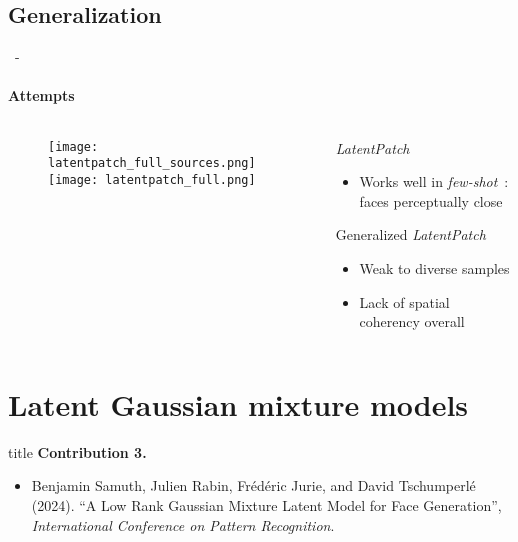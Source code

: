 \documentclass[aspectratio=169, 22pt]{beamer}
\begin{document}
\subsection{Generalization}
\begin{frame}{\secname~- \subsecname}
  \framesubtitle{Attempts}
  \begin{columns}
    \begin{column}{0.5\linewidth}
      \begin{figure}
        \centering
        \texttt{[image: latentpatch\_full\_sources.png]}
        \texttt{[image: latentpatch\_full.png]}
      \end{figure}
    \end{column}
    \begin{column}{0.5\linewidth}
      \begin{exampleblock}{\emph{LatentPatch}}
        \begin{itemize}
        \item Works well in \emph{few-shot} : faces perceptually close
        \end{itemize}
      \end{exampleblock}
      \begin{alertblock}{Generalized \emph{LatentPatch}}
        \begin{itemize}
        \item Weak to diverse samples
        \item Lack of spatial coherency overall
        \end{itemize}
      \end{alertblock}
    \end{column}
  \end{columns}
\end{frame}

\section{Latent Gaussian mixture models}

\begin{frame}
  \vfill
  \begin{beamercolorbox}[sep=15pt,center,shadow=true,rounded=true]{title}
    \LARGE\bfseries Contribution 3. \\ \secname
  \end{beamercolorbox}
  \vfill
  \begin{itemize}
    \item \footnotesize Benjamin Samuth, Julien Rabin, Frédéric Jurie, and David
      Tschumperlé (2024). ``A Low Rank Gaussian Mixture Latent Model for
      Face Generation'', \emph{International Conference on Pattern
        Recognition}.
  \end{itemize}
\end{frame}
\end{document}
